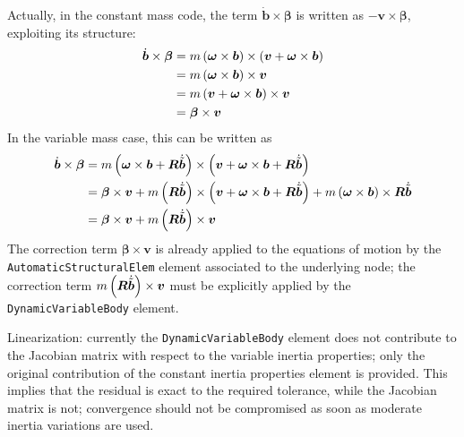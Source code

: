 \documentclass[10pt,fleqn,subeqn]{report}
\newcommand{\T}[1]{\bm{#1}}
\newcommand{\TT}[1]{\bm{#1}}
\begin{document}
Actually, in the constant mass code, the term $\dot{\T{b}} \times \T{\beta}$
is written as $-\T{v}\times\T{\beta}$, exploiting its structure:
\begin{align}
	\dot{\T{b}} \times \T{\beta}
	&=
	m \plbr{\T{\omega} \times \T{b}} \times \plbr{\T{v} + \T{\omega} \times \T{b}}
	\nonumber \\
	&=
	m \plbr{\T{\omega} \times \T{b}} \times \T{v}
	\nonumber \\
	&=
	m \plbr{\T{v} + \T{\omega} \times \T{b}} \times \T{v}
	\nonumber \\
	&=
	\T{\beta} \times \T{v}
\end{align}
In the variable mass case, this can be written as
\begin{align}
	\dot{\T{b}} \times \T{\beta}
	&=
	m \plbr{\T{\omega} \times \T{b} + \TT{R} \dot{\tilde{\T{b}}}} \times
		\plbr{\T{v} + \T{\omega} \times \T{b} + \TT{R} \dot{\tilde{\T{b}}}}
	\nonumber \\
	&=
	\T{\beta} \times \T{v}
	+
	m \plbr{\TT{R} \dot{\tilde{\T{b}}}} \times 
		\plbr{\T{v} + \T{\omega} \times \T{b} + \TT{R} \dot{\tilde{\T{b}}}}
	+
	m \plbr{\T{\omega} \times \T{b}} \times \TT{R} \dot{\tilde{\T{b}}}
	\nonumber \\
	&=
	\T{\beta} \times \T{v}
	+
	m \plbr{\TT{R} \dot{\tilde{\T{b}}}} \times \T{v}
\end{align}
The correction term $\T{\beta} \times \T{v}$ is already applied
to the equations of motion by the \texttt{AutomaticStructuralElem}
element associated to the underlying node;
the correction term $m \plbr{\TT{R} \dot{\tilde{\T{b}}}} \times \T{v}$
must be explicitly applied by the \texttt{DynamicVariableBody} element.

\bigskip
Linearization:
currently the \texttt{DynamicVariableBody} element does not contribute
to the Jacobian matrix with respect to the variable inertia properties;
only the original contribution of the constant inertia properties element
is provided.
This implies that the residual is exact to the required tolerance,
while the Jacobian matrix is not; convergence should not be compromised
as soon as moderate inertia variations are used.
\end{document}
